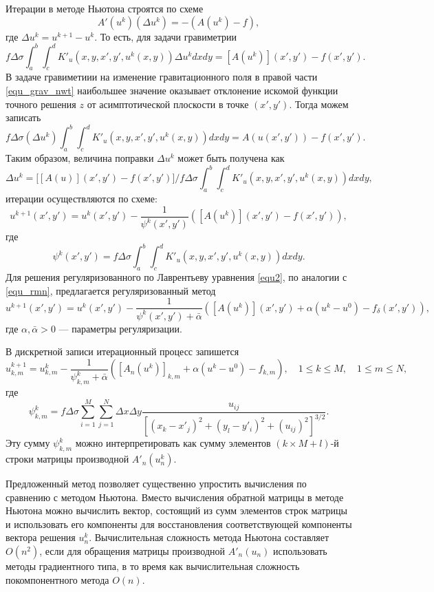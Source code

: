 Итерации в методе Ньютона строятся по схеме
$$A'(u^k)(\Delta u^k)=-(A(u^k)-f),$$ где $\Delta u^k=u^{k+1}-u^k$.
То есть, для задачи гравиметрии
\begin{equation}\label{equ_grav_nwt}
f\Delta\sigma\int_{a}^{b}\int_{c}^{d}K'_u(x,y, x',y',u^k(x,y))\Delta u^k dxdy=[A(u^k)](x',y')-f(x',y').
\end{equation}
В задаче гравиметиии на изменение гравитационного поля в правой части \eqref{equ_grav_nwt} наибольшее значение оказывает отклонение искомой функции точного решения $z$ от асимптотической плоскости в точке $(x',y')$. Тогда можем записать
\begin{equation}\label{comp_newt_meth_step1}
f\Delta\sigma(\Delta u^k)\int_{a}^{b}\int_{c}^{d}K'_u(x,y, x',y',u^k(x,y)) dxdy=A(u(x',y'))-f(x',y').
\end{equation}
Таким образом, величина поправки $\Delta u^k$ может быть получена как
$$\Delta u^k=\bigg[[A(u)](x',y')-f(x',y')\bigg]\bigg/f\Delta\sigma\int_{a}^{b}\int_{c}^{d}K'_u(x,y, x',y',u^k(x,y)) dxdy,$$ 
итерации осуществляются по схеме:
\begin{equation}\label{comp_newt_meth}
u^{k+1}(x',y')=u^k(x',y')-\frac{1}{\psi^k(x',y')}([A(u^k)](x',y')-f(x',y')),
\end{equation}
где $$\psi^k(x',y')=f\Delta\sigma\int_{a}^{b}\int_{c}^{d}K'_u(x,y, x',y',u^k(x,y)) dxdy.$$
Для решения регуляризованного по Лаврентьеву уравнения \eqref{equ2}, по аналогии с \eqref{equ_rmn}, предлагается регуляризованный метод
\begin{equation}\label{rcomp_newt_meth}
u^{k+1}(x',y')=u^k(x',y')-\frac{1}{\psi^k(x',y')+\bar\alpha}([A(u^k)](x',y') + \alpha(u^k-u^0)-f_\delta(x',y')),
\end{equation}
где $\alpha, \bar{\alpha} > 0$ --- параметры регуляризации.

В дискретной записи итерационный процесс запишется
$$u_{k,m}^{k+1}=u_{k,m}^k-\frac{1}{\psi_{k,m}^k+\bar\alpha}([A_n(u^k)]_{k,m} + \alpha(u^k-u^0) -f_{k,m}),\quad 1\le k \le M, \quad 1\le m \le N,$$
где $$\psi_{k,m}^k=f\Delta\sigma\sum\limits_{i=1}^{M}\sum\limits_{j=1}^{N}
\Delta x\Delta y\frac{u_{ij}}{[(x_k-x'_j)^2+(y_l-y'_i)^2+(u_{ij})^2]^{3/2}}.$$
Эту сумму $\psi_{k,m}^k$ можно интерпретировать как сумму элементов $(k\times M + l)$-й строки матрицы производной $A'_n(u_n^k)$.

Предложенный метод позволяет существенно упростить вычисления по сравнению с методом Ньютона. Вместо вычисления обратной матрицы в методе Ньютона можно вычислить вектор, состоящий из сумм элементов строк матрицы и использовать его компоненты для восстановления соответствующей компоненты вектора решения $u_n^k$. Вычислительная сложность метода Ньютона составляет $O(n^2)$, если для обращения матрицы производной $A'_n(u_n)$ использовать методы градиентного типа, в то время как вычислительная сложность покомпонентного метода $O(n)$.

